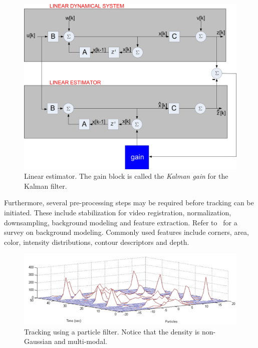 								\begin{figure}[t]
								\center
								\includegraphics[width=1.0\textwidth]{thesis/TRK_LinearEstimator_blockDiagram.pdf}
								\caption{Linear estimator.  The gain block is called the \emph{Kalman gain} for the Kalman filter.}
								\label{TRK_overviewDiagram}
								\end{figure}

Furthermore, several pre-processing steps may be required before tracking can be initiated.  These include stabilization for video registration, normalization, downsampling, background modeling and feature extraction.  Refer to~\cite{1999_CNF_Wallflower_Toyama} for a survey on background modeling. Commonly used features include corners, area, color, intensity distributions, contour descriptors and depth.

								\begin{figure}[t]
								\center
								\includegraphics[width=1.0\textwidth]{thesis/TRK_ParticleFilter_multimodalPDF_part.png}
								\caption{Tracking using a particle filter.  Notice that the density is non-Gaussian and multi-modal.}
								\label{fig:particle_filter_multi_modal_density}
								\end{figure}



